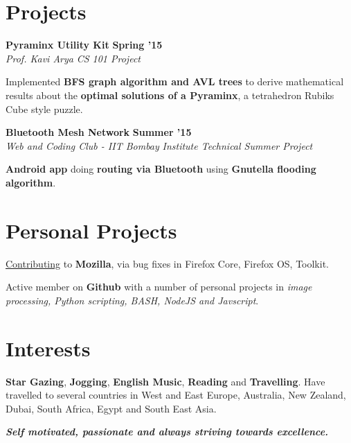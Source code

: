 \documentclass[11pt]{resume}
\begin{document}
\begin{resume}
\section{\mysidestyle Projects}
\textbf{Pyraminx Utility Kit} \hfill \textbf{Spring '15}\\
\textsl{Prof. Kavi Arya} \hfill \textsl{CS 101 Project}\\
\vspace{-4mm}
\begin{list2}
\item Implemented \textbf{BFS graph algorithm and AVL trees} to derive mathematical results about the \textbf{optimal solutions of a Pyraminx}, a tetrahedron Rubiks Cube style puzzle.
\end{list2}
\textbf{Bluetooth Mesh Network} \hfill \textbf{Summer '15}\\
\textsl{Web and Coding Club - IIT Bombay} \hfill \textsl{Institute Technical Summer Project}\\
\vspace{-4mm}
\begin{list2}
\item \textbf{Android app} doing \textbf{routing via Bluetooth} using \textbf{Gnutella flooding algorithm}.
\end{list2}



\section{\mysidestyle Personal Projects}

\begin{list2}
\item \href{httpss://bugzilla.mozilla.org/user_profile?login=kalpeshk2011\%40gmail.com}{Contributing} to \textbf{Mozilla}, via bug fixes in Firefox Core, Firefox OS, Toolkit.
\item Active member on \textbf{Github} with a number of personal projects in \textsl{image processing, Python scripting, BASH, NodeJS and Javscript}.

\end{list2}
\section{\mysidestyle Interests} \textbf{Star Gazing}, \textbf{Jogging}, \textbf{English Music}, \textbf{Reading} and \textbf{Travelling}. Have travelled to several countries in West and East Europe, Australia, New Zealand, Dubai, South Africa, Egypt and South East Asia.

\textit{\textbf{Self motivated, passionate and always striving towards excellence.}}




    

\end{resume}
\end{document}

